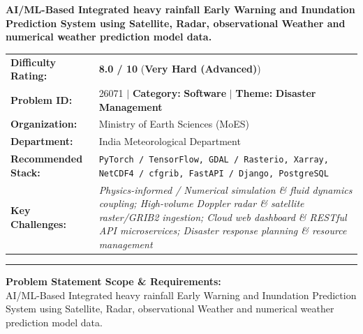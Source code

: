 \documentclass[10pt,a4paper]{article}
\begin{document}
\begin{tcolorbox}[pscard, title={"\textbf{SIH26071} \quad $\vert$ \quad AI/ML-Based Integrated heavy rainfall Early Warning and Inundation Predicti...}]
\textbf{\large AI/ML-Based Integrated heavy rainfall Early Warning and Inundation Prediction System using Satellite, Radar, observational Weather and numerical weather prediction model data.}\\[0.25cm]

\begin{tabular}{@{}lp{12.5cm}@{}}
\textbf{Difficulty Rating:} & \textcolor{diffveryhard}{\textbf{\Large 8.0 / 10}} \quad (\textbf{Very Hard (Advanced)}) \\
\textbf{Problem ID:} & 26071 \quad $\vert$ \quad \textbf{Category:} \textbf{Software} \quad $\vert$ \quad \textbf{Theme:} \textbf{Disaster Management} \\
\textbf{Organization:} & Ministry of Earth Sciences (MoES) \\
\textbf{Department:} & India Meteorological Department \\
\textbf{Recommended Stack:} & \texttt{PyTorch / TensorFlow, GDAL / Rasterio, Xarray, NetCDF4 / cfgrib, FastAPI / Django, PostgreSQL} \\
\textbf{Key Challenges:} & \textit{\small Physics-informed / Numerical simulation \& fluid dynamics coupling; High-volume Doppler radar \& satellite raster/GRIB2 ingestion; Cloud web dashboard \& RESTful API microservices; Disaster response planning \& resource management} \\
\end{tabular}

\vspace{0.2cm}
\hrule
\vspace{0.2cm}

\textbf{\color{sihnavy}Problem Statement Scope \& Requirements:}\\[0.15cm]
\noindent\small AI/ML-Based Integrated heavy rainfall Early Warning and Inundation Prediction System using Satellite, Radar, observational Weather and numerical weather prediction model data.\par\vspace{0.06cm}

\end{tcolorbox}
\vspace{0.4cm}
{}
\end{document}

